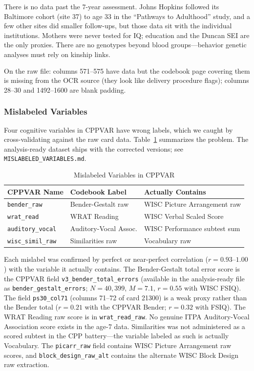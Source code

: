 \documentclass[12pt]{article}
\begin{document}
There is no data past the 7-year assessment. Johns Hopkins followed its Baltimore cohort (site 37) to age 33 in the ``Pathways to Adulthood'' study, and a few other sites did smaller follow-ups, but those data sit with the individual institutions. Mothers were never tested for IQ; education and the Duncan SEI are the only proxies. There are no genotypes beyond blood groups---behavior genetic analyses must rely on kinship links.

On the raw file: columns 571--575 have data but the codebook page covering them is missing from the OCR source (they look like delivery procedure flags); columns 28--30 and 1492--1600 are blank padding.

\subsubsection*{Mislabeled Variables}

Four cognitive variables in CPPVAR have wrong labels, which we caught by cross-validating against the raw card data. Table~\ref{tab:mislabeled} summarizes the problem. The analysis-ready dataset ships with the corrected versions; see \texttt{MISLABELED\_VARIABLES.md}.

\begin{table}[H]
\centering
\caption{Mislabeled Variables in CPPVAR}
\label{tab:mislabeled}
\begin{tabular}{lll}
\toprule
CPPVAR Name & Codebook Label & Actually Contains \\
\midrule
\texttt{bender\_raw} & Bender-Gestalt raw & WISC Picture Arrangement raw \\
\texttt{wrat\_read} & WRAT Reading & WISC Verbal Scaled Score \\
\texttt{auditory\_vocal} & Auditory-Vocal Assoc. & WISC Performance subtest sum \\
\texttt{wisc\_simil\_raw} & Similarities raw & Vocabulary raw \\
\bottomrule
\end{tabular}
\end{table}

\noindent Each mislabel was confirmed by perfect or near-perfect correlation ($r = 0.93$--$1.00$) with the variable it actually contains. The Bender-Gestalt total error score is the CPPVAR field \texttt{v3\_bender\_total\_errors} (available in the analysis-ready file as \texttt{bender\_gestalt\_errors}; $N = 40{,}399$, $M = 7.1$, $r = 0.55$ with WISC FSIQ). The field \texttt{ps30\_col71} (columns 71--72 of card 21300) is a weak proxy rather than the Bender total ($r = 0.21$ with the CPPVAR Bender; $r = 0.32$ with FSIQ). The WRAT Reading raw score is in \texttt{wrat\_read\_raw}. No genuine ITPA Auditory-Vocal Association score exists in the age-7 data. Similarities was not administered as a scored subtest in the CPP battery---the variable labeled as such is actually Vocabulary. The \texttt{picarr\_raw} field contains WISC Picture Arrangement raw scores, and \texttt{block\_design\_raw\_alt} contains the alternate WISC Block Design raw extraction.
\end{document}

